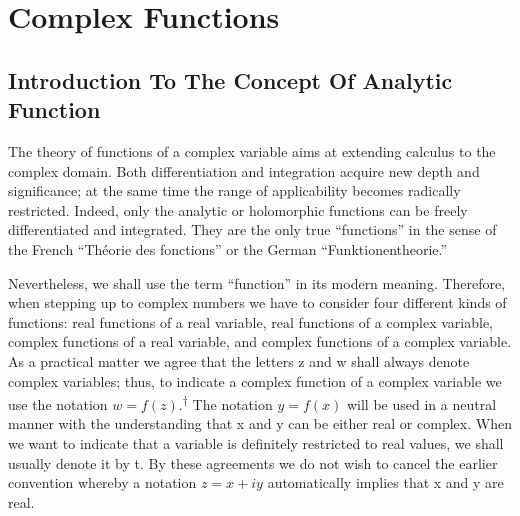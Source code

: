 \chapter{Complex Functions}\label{chap:2}

\setcounter{section}{0}\section{Introduction To The Concept Of Analytic Function}\label{sec:2.1}
The theory of functions of a complex variable aims at extending calculus to the complex domain. Both differentiation and integration acquire new depth and significance; at the same time the range of applicability becomes radically restricted. Indeed, only the analytic or holomorphic functions can be freely differentiated and integrated. They are the only true “functions” in the sense of the French “Théorie des fonctions” or the German “Funktionentheorie.”

Nevertheless, we shall use the term “function” in its modern meaning. Therefore, when stepping up to complex numbers we have to consider four different kinds of functions: real functions of a real variable, real functions of a complex variable, complex functions of a real variable, and complex functions of a complex variable. As a practical matter we agree that the letters z and w shall always denote complex variables; thus, to indicate a complex function of a complex variable we use the notation $w = f(z)$.\hyperlink{fn:37:dagger}{\textsuperscript{\ensuremath{\dagger}}} The notation $y = f(x)$ will be used in a neutral manner with the understanding that x and y can be either real or complex. When we want to indicate that a variable is definitely restricted to real values, we shall usually denote it by t. By these agreements we
\begingroup\renewcommand{\thefootnote}{}\endgroup
do not wish to cancel the earlier convention whereby a notation $z = x + iy$ automatically implies that x and y are real.

